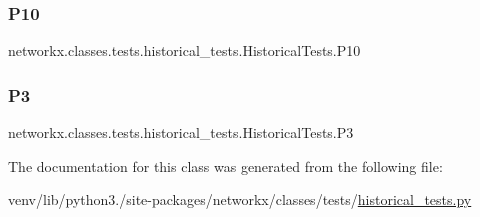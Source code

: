 \subsubsection{\texorpdfstring{P10}{P10}}
{\footnotesize\ttfamily networkx.\+classes.\+tests.\+historical\+\_\+tests.\+Historical\+Tests.\+P10}

\mbox{\label{classnetworkx_1_1classes_1_1tests_1_1historical__tests_1_1HistoricalTests_a85ee77c8806a3242b26d676f5cc4a4dd}} 
\subsubsection{\texorpdfstring{P3}{P3}}
{\footnotesize\ttfamily networkx.\+classes.\+tests.\+historical\+\_\+tests.\+Historical\+Tests.\+P3}



The documentation for this class was generated from the following file\+:\begin{DoxyCompactItemize}
\item 
venv/lib/python3./site-\/packages/networkx/classes/tests/\hyperlink{historical__tests_8py}{historical\+\_\+tests.\+py}\end{DoxyCompactItemize}
